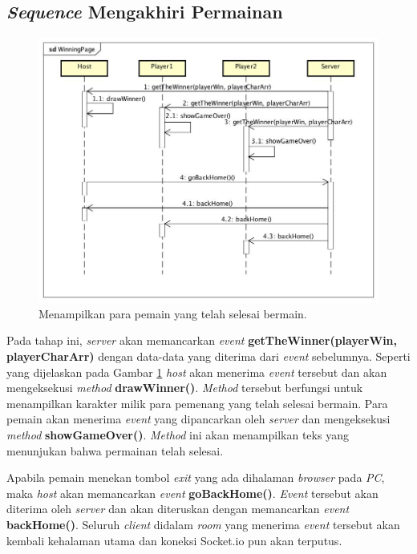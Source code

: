\subsection{\textit{Sequence} Mengakhiri Permainan}
\begin{figure}[H]
	\centering
	\includegraphics[scale=0.33]{Gambar/WinningPage}
	\caption{Menampilkan para pemain yang telah selesai bermain.}
	\label{fig:4_WinningPage}
\end{figure}

Pada tahap ini, \textit{server} akan memancarkan \textit{event} \textbf{getTheWinner(playerWin, playerCharArr)} dengan data-data yang diterima dari \textit{event} sebelumnya. Seperti yang dijelaskan pada Gambar \ref{fig:4_WinningPage} \textit{host} akan menerima \textit{event} tersebut dan akan mengeksekusi \textit{method} \textbf{drawWinner()}. \textit{Method} tersebut berfungsi untuk menampilkan karakter milik para pemenang yang telah selesai bermain. Para pemain akan menerima \textit{event} yang dipancarkan oleh \textit{server} dan mengeksekusi \textit{method} \textbf{showGameOver()}. \textit{Method} ini akan menampilkan teks yang menunjukan bahwa permainan telah selesai.

Apabila pemain menekan tombol \textit{exit} yang ada dihalaman \textit{browser} pada \textit{PC}, maka \textit{host} akan memancarkan \textit{event} \textbf{goBackHome()}. \textit{Event} tersebut akan diterima oleh \textit{server} dan akan diteruskan dengan memancarkan \textit{event} \textbf{backHome()}. Seluruh \textit{client} didalam \textit{room} yang menerima \textit{event} tersebut akan kembali kehalaman utama dan koneksi Socket.io pun akan terputus.


